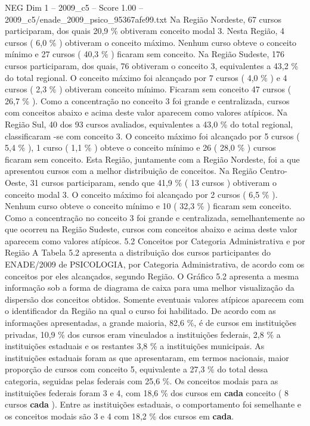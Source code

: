 \begin{textsample}{NEG Dim 1 – 2009\_c5 – Score 1.00 – 2009\_c5/enade\_2009\_psico\_95367afe99.txt}
Na Região Nordeste, 67 cursos participaram, dos quais 20,9 \% obtiveram conceito modal 3.
Nesta Região, 4 cursos ( 6,0 \% ) obtiveram o conceito máximo.
Nenhum curso obteve o conceito mínimo e 27 cursos ( 40,3 \% ) ficaram sem conceito.
Na Região Sudeste, 176 cursos participaram, dos quais, 76 obtiveram o conceito 3, equivalentes a 43,2 \% do total regional.
O conceito máximo foi alcançado por 7 cursos ( 4,0 \% ) e 4 cursos ( 2,3 \% ) obtiveram conceito mínimo.
Ficaram sem conceito 47 cursos ( 26,7 \% ).
Como a concentração no conceito 3 foi grande e centralizada, cursos com conceitos abaixo e acima deste valor aparecem como valores atípicos.
Na Região Sul, 40 dos 93 cursos avaliados, equivalentes a 43,0 \% do total regional, classificaram -se com conceito 3.
O conceito máximo foi alcançado por 5 cursos ( 5,4 \% ), 1 curso ( 1,1 \% ) obteve o conceito mínimo e 26 ( 28,0 \% ) cursos ficaram sem conceito.
Esta Região, juntamente com a Região Nordeste, foi a que apresentou cursos com a melhor distribuição de conceitos.
Na Região Centro-Oeste, 31 cursos participaram, sendo que 41,9 \% ( 13 cursos ) obtiveram o conceito modal 3.
O conceito máximo foi alcançado por 2 cursos ( 6,5 \% ).
Nenhum curso obteve o conceito mínimo e 10 ( 32,3 \% ) ficaram sem conceito.
Como a concentração no conceito 3 foi grande e centralizada, semelhantemente ao que ocorreu na Região Sudeste, cursos com conceitos abaixo e acima deste valor aparecem como valores atípicos. 5.2 Conceitos por Categoria Administrativa e por Região A Tabela 5.2 apresenta a distribuição dos cursos participantes do ENADE/2009 de PSICOLOGIA, por Categoria Administrativa, de acordo com os conceitos por eles alcançados, segundo Região.
O Gráfico 5.2 apresenta a mesma informação sob a forma de diagrama de caixa para uma melhor visualização da dispersão dos conceitos obtidos.
Somente eventuais valores atípicos aparecem com o identificador da Região na qual o curso foi habilitado.
De acordo com as informações apresentadas, a grande maioria, 82,6 \%, é de cursos em instituições privadas, 10,9 \% dos cursos eram vinculados a instituições federais, 2,8 \% a instituições estaduais e os restantes 3,8 \% a instituições municipais.
As instituições estaduais foram as que apresentaram, em termos nacionais, maior proporção de cursos com conceito 5, equivalente a 27,3 \% do total dessa categoria, seguidas pelas federais com 25,6 \%.
Os conceitos modais para as instituições federais foram 3 e 4, com 18,6 \% dos cursos em \textbf{cada} conceito ( 8 cursos \textbf{cada} ).
Entre as instituições estaduais, o comportamento foi semelhante e os conceitos modais são 3 e 4 com 18,2 \% dos cursos em \textbf{cada}.

\end{textsample}
